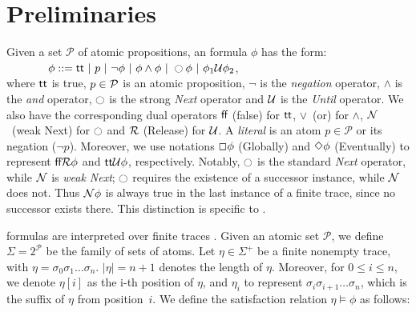 \section{Preliminaries}\label{sec:pre}
Given a set $\mathcal{P}$ of atomic propositions, an \ltlf formula
$\phi$ has the form:
$\ \ \ \ \ \ \ \ \ \ \ \phi ::= \true\ |\ p\ |\ \neg \phi\ |\ \phi\wedge\phi\ |\ \ocircle \phi\ |\ \phi_1 \U\phi_2$,\\
%
where $\true$ is true, $p \in \P$ is an atomic proposition, $\neg$ is the \emph{negation} operator, $\wedge$ is the \emph{and} operator, $\ocircle$ is the strong \emph{Next} operator 
and  $\U$ is the \emph{Until} operator. We also have the corresponding dual operators $\ff$ (false) for $\true$, $\vee$~(or) for $\wedge$, 
$\N$~(weak Next) for $\ocircle$ and $\R$ (Release) for $\U$. A \emph{literal} is an atom $p\in\mathcal{P}$ or its negation ($\neg p$).
Moreover, we use notations $\G\phi$ (Globally) and $\F\phi$ (Eventually) to represent $\ff \R\phi$ and $\true \U\phi$, respectively.
Notably, $\ocircle$ is the standard \emph{Next} operator, while $\N$ is \emph{weak Next}; 
$\ocircle$ requires the existence of a successor instance, while $\N$ does not. 
Thus $\N\phi$ is always true in the last instance of a finite trace, since no successor exists there.
This distinction is specific to \ltlf.

\ltlf formulas are interpreted over finite traces \cite{GV13}.
Given an atomic set $\mathcal{P}$, we define $\Sigma = 2^{\mathcal{P}}$ be  the family of sets of atoms. Let
$\eta\in\Sigma^+$ be a finite nonempty trace, with $\eta=\sigma_0\sigma_1\ldots\sigma_n$. $|\eta|=n+1$ denotes the length of $\eta$. Moreover, for $0\leq
i\leq n$, we denote $\eta[i]$ as the i-th position of $\eta$, and 
$\eta_i$ to represent $\sigma_i\sigma_{i+1}\ldots\sigma_n$, which is
the suffix of $\eta$ from position~$i$. We define the satisfaction relation $\eta\models\phi$ as follows:


